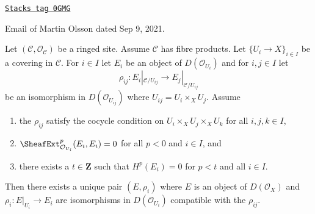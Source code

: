 \begin{lemma}
\label{spaces-simplicial-lemma-bbd-glueing-cech}
\href{https://stacks.math.columbia.edu/tag/0GMG}{\texttt{Stacks tag 0GMG}}

\begin{reference}
Email of Martin Olsson dated Sep 9, 2021.
\end{reference}
Let $(\mathcal{C}, \mathcal{O}_\mathcal{C})$ be a ringed site.
Assume $\mathcal{C}$ has fibre products.
Let $\{U_i \to X\}_{i \in I}$ be a covering in $\mathcal{C}$.
For $i \in I$ let $E_i$ be an object of $D(\mathcal{O}_{U_i})$ and
for $i, j \in I$ let
$$
\rho_{ij} : E_i|_{\mathcal{C}/U_{ij}} \longrightarrow E_j|_{\mathcal{C}/U_{ij}}
$$
be an isomorphism in $D(\mathcal{O}_{U_{ij}})$ where
$U_{ij} = U_i \times_X U_j$. Assume
\begin{enumerate}
\item the $\rho_{ij}$ satisfy the cocycle condition on
$U_i \times_X U_j \times_X U_k$ for all $i, j, k \in I$,
\item $\SheafExt^p_{\mathcal{O}_{U_i}}(E_i, E_i) = 0$
for all $p < 0$ and $i \in I$, and
\item there exists a $t \in \mathbf{Z}$ such that
$H^p(E_i) = 0$ for $p < t$ and all $i \in I$.
\end{enumerate}
Then there exists a unique pair $(E, \rho_i)$ where $E$ is an object of
$D(\mathcal{O}_X)$ and $\rho_i : E|_{U_i} \to E_i$ are isomorphisms in
$D(\mathcal{O}_{U_i})$ compatible with the $\rho_{ij}$.
\end{lemma}

